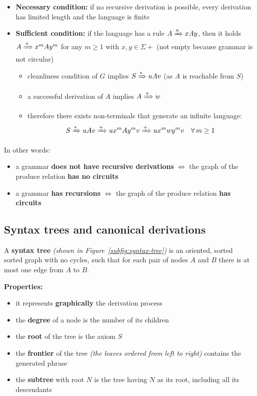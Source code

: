\documentclass[english]{article}
\begin{document}
\begin{itemize}
  \item \textbf{Necessary condition:} if no recursive derivation is possible, every derivation has limited length and the language is finite
  \item \textbf{Sufficient condition:} if the language has a rule \(A \xRightarrow{n} x A y\), then it holds \(A \xRightarrow{+} x^m A y^m\) for any \(m \geq 1\) with \(x, y \in \Sigma+\) (not empty because grammar is not circular)
        \begin{itemize}
          \item cleanliness condition of \(G\) implies \(S \xRightarrow{\ast} uAv\) (as \(A\) is reachable from \(S\))
          \item a successful derivation of \(A\) implies \(A \xRightarrow{+} w\)
          \item therefore there exists non-terminals that generate an infinite language:
                \[ S \xRightarrow{\ast} uAv \xRightarrow{+}ux^m Ay^m v \xRightarrow{+} u x^m w y^m v \quad \forall \, m \geq 1 \]
        \end{itemize}
\end{itemize}

\bigskip
In other words:

\begin{itemize}
  \item a grammar \textbf{does not have recursive derivations} \(\Longleftrightarrow\) the graph of the produce relation \textbf{has no circuits}
  \item a grammar \textbf{has recursions} \(\Longleftrightarrow\) the graph of the produce relation \textbf{has circuits}
\end{itemize}

\subsection{Syntax trees and canonical derivations}

A \textbf{syntax tree} \textit{(shown in Figure~\ref{subfig:syntax-tree})} is an oriented, sorted sorted graph with no cycles, such that for each pair of nodes \(A\) and \(B\) there is at most one edge from \(A\) to \(B\).

\bigskip
\textbf{Properties:}

\begin{itemize}
  \item it represents \textbf{graphically} the derivation process
  \item the \textbf{degree} of a node is the number of its children
  \item the \textbf{root} of the tree is the axiom \(S\)
  \item the \textbf{frontier} of the tree \textit{(the leaves ordered from left to right)} contains the generated phrase
  \item the \textbf{subtree} with root \(N\) is the tree having \(N\) as its root, including all its descendants
\end{itemize}
\end{document}
